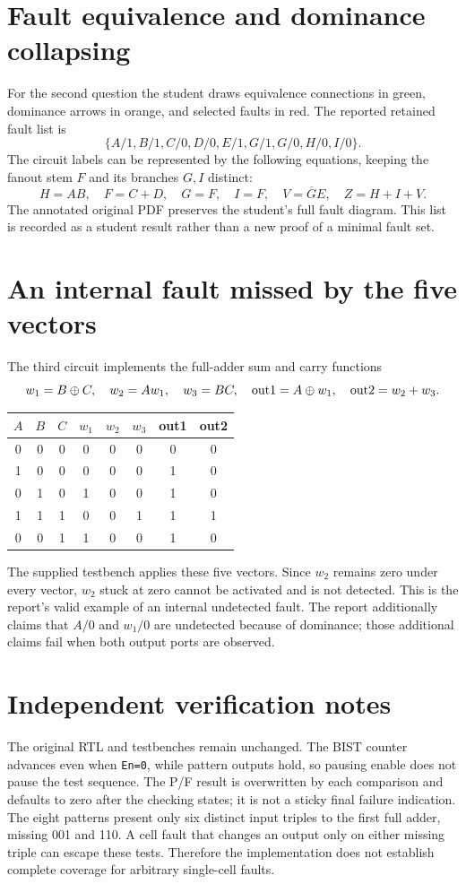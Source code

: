 \documentclass[11pt,a4paper]{article}
\newcommand{\sa}[2]{#1/\mathrm{#2}}
\begin{document}
\section{Fault equivalence and dominance collapsing}
For the second question the student draws equivalence connections in green, dominance arrows in orange, and selected faults in red. The reported retained fault list is
\[
\{\sa{A}{1},\sa{B}{1},\sa{C}{0},\sa{D}{0},\sa{E}{1},
\sa{G}{1},\sa{G}{0},\sa{H}{0},\sa{I}{0}\}.
\]
The circuit labels can be represented by the following equations, keeping the fanout stem $F$ and its branches $G,I$ distinct:
\[
H=AB,\quad F=C+D,\quad G=F,\quad I=F,\quad
V=\overline G E,\quad Z=H+I+V.
\]
The annotated original PDF preserves the student's full fault diagram. This list is recorded as a student result rather than a new proof of a minimal fault set.

\section{An internal fault missed by the five vectors}
The third circuit implements the full-adder sum and carry functions
\[
w_1=B\oplus C,\quad w_2=Aw_1,\quad w_3=BC,\quad
{\rm out1}=A\oplus w_1,\quad {\rm out2}=w_2+w_3.
\]
\begin{center}
\begin{tabular}{ccc|ccc|cc}\toprule
$A$&$B$&$C$&$w_1$&$w_2$&$w_3$&out1&out2\\\midrule
0&0&0&0&0&0&0&0\\
1&0&0&0&0&0&1&0\\
0&1&0&1&0&0&1&0\\
1&1&1&0&0&1&1&1\\
0&0&1&1&0&0&1&0\\\bottomrule
\end{tabular}
\end{center}
The supplied testbench applies these five vectors. Since $w_2$ remains zero under every vector, $w_2$ stuck at zero cannot be activated and is not detected. This is the report's valid example of an internal undetected fault. The report additionally claims that $A/0$ and $w_1/0$ are undetected because of dominance; those additional claims fail when both output ports are observed.

\section{Independent verification notes}
The original RTL and testbenches remain unchanged. The BIST counter advances even when \texttt{En=0}, while pattern outputs hold, so pausing enable does not pause the test sequence. The P/F result is overwritten by each comparison and defaults to zero after the checking states; it is not a sticky final failure indication. The eight patterns present only six distinct input triples to the first full adder, missing 001 and 110. A cell fault that changes an output only on either missing triple can escape these tests. Therefore the implementation does not establish complete coverage for arbitrary single-cell faults.
\end{document}
